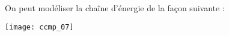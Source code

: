 

On peut modéliser la chaîne d'énergie de la façon suivante : 
\begin{center}
\texttt{[image: ccmp\_07]}
\end{center}

